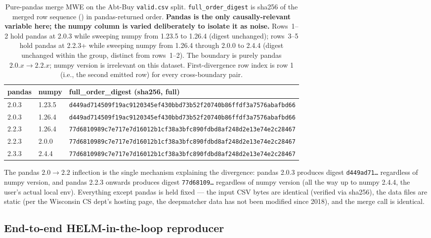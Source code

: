 \documentclass[11pt]{article}
\begin{document}
\begin{table}[htbp]
\centering
\small
\caption{Pure-pandas merge MWE on the Abt-Buy \texttt{valid.csv}
  split.
\texttt{full\_order\_digest} is sha256 of the merged row sequence
  () in pandas-returned order.
\textbf{Pandas is the only causally-relevant variable here; the
  numpy column is varied deliberately to isolate it as noise.}
  Rows~1--2 hold pandas at 2.0.3 while sweeping numpy from 1.23.5 to
  1.26.4 (digest unchanged); rows~3--5 hold pandas at 2.2.3+ while
  sweeping numpy from 1.26.4 through 2.0.0 to 2.4.4 (digest
  unchanged within the group, distinct from rows~1--2).
The boundary is purely pandas $2.0.x \to 2.2.x$; numpy version is
  irrelevant on this dataset.
First-divergence row index is row 1 (i.e., the second emitted row)
  for every cross-boundary pair.}
\label{tab:tr-em-pandas-mwe}
\begin{tabular}{lll}
\toprule
pandas & numpy & full\_order\_digest (sha256, full) \\
\midrule
2.0.3 & 1.23.5 & \texttt{d449ad714509f19ac9120345ef430bbd73b52f20740b86ffdf3a7576abafbd66} \\
2.0.3 & 1.26.4 & \texttt{d449ad714509f19ac9120345ef430bbd73b52f20740b86ffdf3a7576abafbd66} \\
2.2.3 & 1.26.4 & \texttt{77d6810989c7e717e7d16012b1cf38a3bfc890fdbd8af248d2e13e74e2c28467} \\
2.2.3 & 2.0.0  & \texttt{77d6810989c7e717e7d16012b1cf38a3bfc890fdbd8af248d2e13e74e2c28467} \\
2.3.3 & 2.4.4  & \texttt{77d6810989c7e717e7d16012b1cf38a3bfc890fdbd8af248d2e13e74e2c28467} \\
\bottomrule
\end{tabular}
\end{table}

The pandas $2.0 \to 2.2$ inflection is the single mechanism explaining
  the divergence: pandas 2.0.3 produces digest \texttt{d449ad71\dots}
  regardless of numpy version, and pandas 2.2.3 onwards produces
  digest \texttt{77d68109\dots} regardless of numpy version
  (all the way up to numpy 2.4.4, the user's actual local env).
Everything except pandas is held fixed --- the input CSV bytes are
  identical (verified via sha256), the data files are static (per the
  Wisconsin CS dept's hosting page, the deepmatcher data has not been
  modified since 2018), and the merge call is identical.

\subsection{End-to-end HELM-in-the-loop reproducer}
\label{sec:tr-case-a-helm-mwe}
\end{document}
